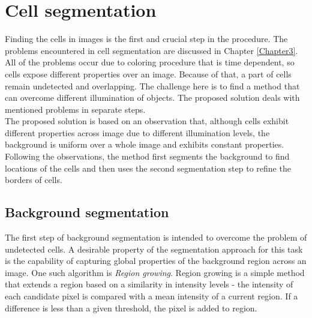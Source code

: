 
\chapter{Cell segmentation} %

\label{Chapter4} %



Finding the cells in images is the first and crucial step in the procedure. The problems encountered in cell segmentation are discussed in Chapter \ref{Chapter3}. All of the problems occur due to coloring procedure that is time dependent, so cells expose different properties over an image. Because of that, a part of cells remain undetected and overlapping. The challenge here is to find a method that can overcome different illumination of objects. The proposed solution deals with mentioned problems in separate steps. \\


The proposed solution is based on an observation that, although cells exhibit different properties across image due to different illumination levels, the background is uniform over a whole image and exhibits constant properties. Following the observations, the method first segments the background to find locations of the cells and then uses the second segmentation step to refine the borders of cells. \\





\section{Background segmentation}

The first step of background segmentation is intended to overcome the problem of undetected cells. A desirable property of the segmentation approach for this task is the capability of capturing global properties of the background region across an image. One such algorithm is \textit{Region growing}. Region growing is a simple method that extends a region based on a similarity in intensity levels - the intensity of each candidate pixel is compared with a mean intensity of a current region. If a difference is less than a given threshold, the pixel is added to region. \\

